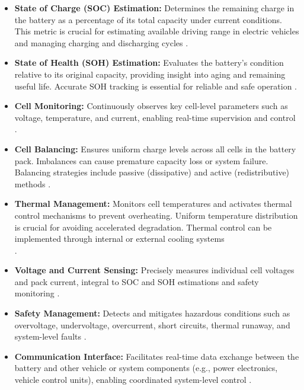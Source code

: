 \begin{itemize}
    \item \textbf{State of Charge (SOC) Estimation:} Determines the remaining charge in the battery as a percentage of its total capacity under current conditions. This metric is crucial for estimating available driving range in electric vehicles and managing charging and discharging cycles \cite{wevj-12-00120-v2}.

    \item \textbf{State of Health (SOH) Estimation:} Evaluates the battery's condition relative to its original capacity, providing insight into aging and remaining useful life. Accurate SOH tracking is essential for reliable and safe operation \cite{wevj-12-00120-v2}.

    \item \textbf{Cell Monitoring:} Continuously observes key cell-level parameters such as voltage, temperature, and current, enabling real-time supervision and control\\ \cite{wevj-12-00120-v2}.

    \item \textbf{Cell Balancing:} Ensures uniform charge levels across all cells in the battery pack. Imbalances can cause premature capacity loss or system failure. Balancing strategies include passive (dissipative) and active (redistributive) methods \cite{wevj-12-00120-v2}.

    \item \textbf{Thermal Management:} Monitors cell temperatures and activates thermal control mechanisms to prevent overheating. Uniform temperature distribution is crucial for avoiding accelerated degradation. Thermal control can be implemented through internal or external cooling systems\\ \cite{wevj-12-00120-v2,energies-18-00342-v2}.

    \item \textbf{Voltage and Current Sensing:} Precisely measures individual cell voltages and pack current, integral to SOC and SOH estimations and safety monitoring \cite{wevj-12-00120-v2}.

    \item \textbf{Safety Management:} Detects and mitigates hazardous conditions such as overvoltage, undervoltage, overcurrent, short circuits, thermal runaway, and system-level faults \cite{wevj-12-00120-v2}.

    \item \textbf{Communication Interface:} Facilitates real-time data exchange between the battery and other vehicle or system components (e.g., power electronics, vehicle control units), enabling coordinated system-level control \cite{wevj-12-00120-v2}.


\end{itemize}
